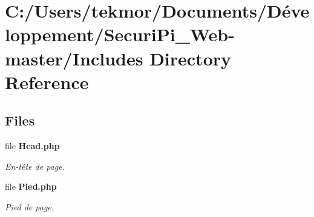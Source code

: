 \section{C\+:/\+Users/tekmor/\+Documents/\+Développement/\+Securi\+Pi\+\_\+\+Web-\/master/\+Includes Directory Reference}
\label{dir_194d638ed86e2f54147b3c03d3210cc4}
\subsection*{Files}
\begin{DoxyCompactItemize}
\item 
file {\bf Head.\+php}
\begin{DoxyCompactList}\small\item\em En-\/t\^{e}te de page. \end{DoxyCompactList}\item 
file {\bf Pied.\+php}
\begin{DoxyCompactList}\small\item\em Pied de page. \end{DoxyCompactList}\end{DoxyCompactItemize}
